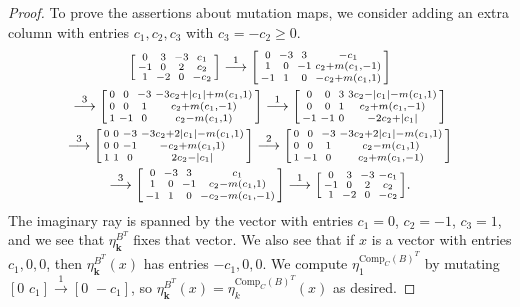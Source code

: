 \documentclass{amsart}
\theoremstyle{definition}
\theoremstyle{remark}
\numberwithin{equation}{section}
\newcommand{\0}{{\mathbf{0}}}
\newcommand{\Comp}{\mathrm{Comp}_C}
\newcommand{\kk}{{\boldsymbol{k}}}
\begin{document}
\begin{proof}
To prove the assertions about mutation maps, we consider adding an extra column with entries $c_1,c_2,c_3$ with $c_3=-c_2\ge0$.
\begin{multline*}
\begin{bsmallmatrix*}
0&3&-3&c_1\\
-1&0&2&c_2\\
1&-2&0&-c_2
\end{bsmallmatrix*}
\overset{1}{\longrightarrow}
\begin{bsmallmatrix*}
0&-3&3&-c_1\\
1&0&-1&c_2+m(c_1,-1)\\
-1&1&0&-c_2+m(c_1,1)
\end{bsmallmatrix*}\\
\overset{3}{\longrightarrow}
\begin{bsmallmatrix*}
0&0&-3&-3c_2+|c_1|+m(c_1,1)\\
0&0&1&c_2+m(c_1,-1)\\
1&-1&0&c_2-m(c_1,1)
\end{bsmallmatrix*}
\overset{1}{\longrightarrow}
\begin{bsmallmatrix*}
0&0&3&3c_2-|c_1|-m(c_1,1)\\
0&0&1&c_2+m(c_1,-1)\\
-1&-1&0&-2c_2+|c_1|
\end{bsmallmatrix*}\\
\overset{3}{\longrightarrow}
\begin{bsmallmatrix*}
0&0&-3&-3c_2+2|c_1|-m(c_1,1)\\
0&0&-1&-c_2+m(c_1,1)\\
1&1&0&2c_2-|c_1|
\end{bsmallmatrix*}
\overset{2}{\longrightarrow}
\begin{bsmallmatrix*}
0&0&-3&-3c_2+2|c_1|-m(c_1,1)\\
0&0&1&c_2-m(c_1,1)\\
1&-1&0&c_2+m(c_1,-1)
\end{bsmallmatrix*}\\
\overset{3}{\longrightarrow}
\begin{bsmallmatrix*}
0&-3&3&c_1\\
1&0&-1&c_2-m(c_1,1)\\
-1&1&0&-c_2-m(c_1,-1)
\end{bsmallmatrix*}
\overset{1}{\longrightarrow}
\begin{bsmallmatrix*}
0&3&-3&-c_1\\
-1&0&2&c_2\\
1&-2&0&-c_2
\end{bsmallmatrix*}.
\end{multline*}
The imaginary ray is spanned by the vector with entries $c_1=0$, $c_2=-1$, $c_3=1$, and we see that $\eta^{B^T}_\kk$ fixes that vector.
We also see that if $x$ is a vector with entries $c_1,0,0$, then $\eta_\kk^{B^T}(x)$ has entries $-c_1,0,0$.
We compute $\eta_1^{\Comp(B)^T}$ by mutating $[0\,\,c_1]\overset{1}{\longrightarrow}[0\,\,-c_1]$, so $\eta^{B^T}_\kk(x)=\eta^{\Comp(B)^T}_k(x)$ as desired.


\end{proof}
\end{document}

